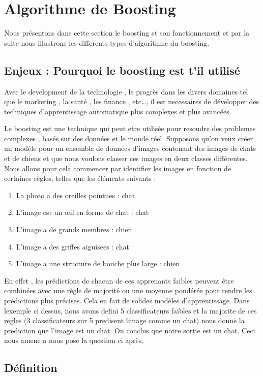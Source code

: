 \documentclass[french,a4paper,12pt]{article}
\begin{document}
\section{Algorithme de Boosting}
\quad 
Nous présentons dans cette section le boosting et son fonctionnement et par la suite nous  illustrons les differents types d'algorithme du boosting.

 \subsection{Enjeux : Pourquoi le boosting est t'il utilisé}

\quad Avec le development de la technologie , le progrès dans les divers domaines tel que le marketing , la santé , les finance , etc…, il est necessaires de développer des techniques d'apprentissage automatique plus complexes et plus avancées\citep{educa}. 

\quad Le boosting est une technique qui peut etre utilisée pour resoudre des problemes complexes , basés sur des données et le monde réel.
Supposons qu'on veux   créer un modèle pour un ensemble de données d'images contenant des images de chats et de chiens et que nous voulons classer ces images en deux classes différentes. Nous allons pour cela  commencer par identifier les images en fonction de certaines règles, telles que les éléments suivants : 
\begin{enumerate} 
    \item La photo a des oreilles pointues : chat
    \item L'image est un œil en forme de chat : chat
    \item L'image a de grands membres : chien
    \item L'image a des griffes aiguisees : chat
     \item L'image a une structure de bouche plus large : chien
\end{enumerate}  

\quad En effet , les prédictions de chacun de ces apprenants faibles peuvent être combinées avec une règle de majorité ou une moyenne pondérée pour rendre les prédictions plus précises. Cela en fait de solides modèles d'apprentissage.
Dans lexemple ci dessus, nous avons defini 5 classificateurs faibles et  la majorite de ces regles (3 classificateurs sur 5 predisent limage comme un chat) nous donne la prediction que l’image est un chat. On conclus que notre sortie est un chat. Ceci nous amene a nous pose la question ci après.

\subsection{Définition}
\end{document}
